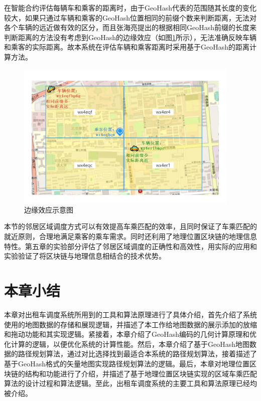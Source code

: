 在智能合约评估每辆车和乘客的距离时，由于GeoHash代表的范围随其长度的变化较大，如果只通过车辆和乘客的GeoHash位置相同的前缀个数来判断距离，无法对各个车辆的远近做有效的区分，而且张海亮提出的根据相同GeoHash前缀的长度来判断距离的方法没有考虑到GeoHash的边缘效应（如图\ref{fig:special}所示），无法准确反映车辆和乘客的实际距离。故本系统在评估车辆和乘客距离时采用基于GeoHash的距离计算方法。

\begin{figure}[h]
  \centering
  \includegraphics[width=0.95\textwidth]{figures/边缘效应}
  \caption{边缘效应示意图}\label{fig:special}
\end{figure}

本节的邻居区域调度方式可以有效提高车乘匹配的效率，且同时保证了车乘匹配的就近原则，合理地满足乘客的乘车需求。同时还利用了地理位置区块链的地理信息特性。第五章的实验部分评估了邻居区域调度的正确性和高效性，用实际的应用和实验验证了将区块链与地理信息相结合的技术优势。

\section{本章小结}
本章对出租车调度系统所用到的工具和算法原理进行了具体介绍，首先介绍了系统使用的地图数据的存储和展现逻辑，并描述了本工作给地图数据的展示添加的放缩和拖动功能和其实现逻辑。紧接着，本章介绍了GeoHash编码的几何计算原理和优化计算的逻辑，以便优化系统的计算性能。然后，本章介绍了基于GeoHash地图数据的路径规划算法，通过对比选择找到最适合本系统的路径规划算法，接着描述了基于GeoHash格式的矢量地图实现路径规划算法的逻辑。最后，本章对地理位置区块链的结构和功能进行了介绍，并描述了基于地理位置区块链实现的区域车乘匹配算法的设计过程和算法逻辑。至此，出租车调度系统的主要工具和算法原理已经均被介绍。
